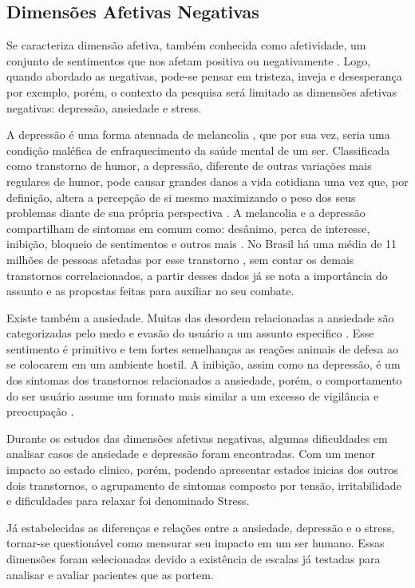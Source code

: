 \subsection{Dimensões Afetivas Negativas}
Se caracteriza dimensão afetiva, também conhecida como afetividade, um conjunto de sentimentos que nos afetam positiva ou negativamente \cite[2-6]{pinto2009afetos}. Logo, quando abordado as negativas, pode-se pensar em tristeza, inveja e desesperança por exemplo, porém, o contexto da pesquisa será limitado as dimensões afetivas negativas: depressão, ansiedade e stress.

A depressão é uma forma atenuada de melancolia \cite{roudinesco2000psicanalise}, que por sua vez, seria uma condição maléfica de enfraquecimento da saúde mental de um ser. Classificada como transtorno de humor, a depressão, diferente de outras variações mais regulares de humor, pode causar grandes danos a vida cotidiana uma vez que, por definição, altera a percepção de si mesmo maximizando o peso dos seus problemas diante de sua própria perspectiva \cite{esteves2006depressao}. A melancolia e a depressão compartilham de sintomas em comum como: desânimo, perca de interesse, inibição, bloqueio de sentimentos e outros mais \cite[28]{freud2014livro}. No Brasil há uma média de 11 milhões de pessoas afetadas por esse transtorno \cite{paho2017-letstalk}, sem contar os demais transtornos correlacionados, a partir desses dados já se nota a importância do assunto e as propostas feitas para auxiliar no seu combate.

Existe também a ansiedade. Muitas das desordem relacionadas a ansiedade são categorizadas pelo medo e evasão do usuário a um assunto especifico \cite[393]{dsmiv}. Esse sentimento é primitivo e tem fortes semelhanças as reações animais de defesa ao se colocarem em um ambiente hostil. A inibição, assim como na depressão, é um dos sintomas dos transtornos relacionados a ansiedade, porém, o comportamento do ser usuário assume um formato mais similar a um excesso de vigilância e preocupação \cite{margis2003relaccao}.

Durante os estudos das dimensões afetivas negativas, algumas dificuldades em analisar casos de ansiedade e depressão foram encontradas. Com um menor impacto ao estado clinico, porém, podendo apresentar estados inicias dos outros dois transtornos, o agrupamento de sintomas composto por tensão, irritabilidade e dificuldades para relaxar foi denominado Stress. \cite{lovibond1995structure, ribeiro2004contribuiccao, margis2003relaccao}

Já estabelecidas as diferenças e relações entre a ansiedade, depressão e o stress, tornar-se questionável como mensurar seu impacto em um ser humano. Essas dimensões foram selecionadas devido a existência de escalas já testadas para analisar e avaliar pacientes que as portem.


